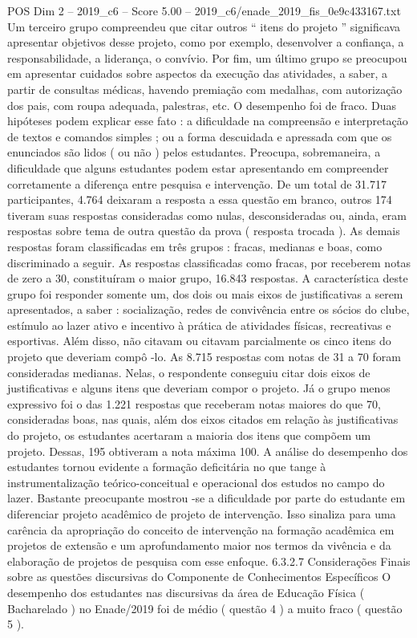 \begin{textsample}{POS Dim 2 – 2019\_c6 – Score 5.00 – 2019\_c6/enade\_2019\_fis\_0e9c433167.txt}
Um terceiro grupo compreendeu que citar outros “ itens do projeto ” significava apresentar objetivos desse projeto, como por exemplo, desenvolver a confiança, a responsabilidade, a liderança, o convívio.
Por fim, um último grupo se preocupou em apresentar cuidados sobre aspectos da execução das atividades, a saber, a partir de consultas médicas, havendo premiação com medalhas, com autorização dos pais, com roupa adequada, palestras, etc.
O desempenho foi de fraco.
Duas hipóteses podem explicar esse fato : a dificuldade na compreensão e interpretação de textos e comandos simples ; ou a forma descuidada e apressada com que os enunciados são lidos ( ou não ) pelos estudantes.
Preocupa, sobremaneira, a dificuldade que alguns estudantes podem estar apresentando em compreender corretamente a diferença entre pesquisa e intervenção.
De um total de 31.717 participantes, 4.764 deixaram a resposta a essa questão em branco, outros 174 tiveram suas respostas consideradas como nulas, desconsideradas ou, ainda, eram respostas sobre tema de outra questão da prova ( resposta trocada ).
As demais respostas foram classificadas em três grupos : fracas, medianas e boas, como discriminado a seguir.
As respostas classificadas como fracas, por receberem notas de zero a 30, constituíram o maior grupo, 16.843 respostas.
A característica deste grupo foi responder somente um, dos dois ou mais eixos de justificativas a serem apresentados, a saber : socialização, redes de convivência entre os sócios do clube, estímulo ao lazer ativo e incentivo à prática de atividades físicas, recreativas e esportivas.
Além disso, não citavam ou citavam parcialmente os cinco itens do projeto que deveriam compô -lo.
As 8.715 respostas com notas de 31 a 70 foram consideradas medianas.
Nelas, o respondente conseguiu citar dois eixos de justificativas e alguns itens que deveriam compor o projeto.
Já o grupo menos expressivo foi o das 1.221 respostas que receberam notas maiores do que 70, consideradas boas, nas quais, além dos eixos citados em relação às justificativas do projeto, os estudantes acertaram a maioria dos itens que compõem um projeto.
Dessas, 195 obtiveram a nota máxima 100.
A análise do desempenho dos estudantes tornou evidente a formação deficitária no que tange à instrumentalização teórico-conceitual e operacional dos estudos no campo do lazer.
Bastante preocupante mostrou -se a dificuldade por parte do estudante em diferenciar projeto acadêmico de projeto de intervenção.
Isso sinaliza para uma carência da apropriação do conceito de intervenção na formação acadêmica em projetos de extensão e um aprofundamento maior nos termos da vivência e da elaboração de projetos de pesquisa com esse enfoque. 6.3.2.7 Considerações Finais sobre as questões discursivas do Componente de Conhecimentos Específicos O desempenho dos estudantes nas discursivas da área de Educação Física ( Bacharelado ) no Enade/2019 foi de médio ( questão 4 ) a muito fraco ( questão 5 ).

\end{textsample}
